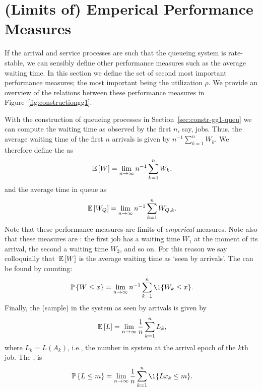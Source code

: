 \section{(Limits of) Emperical Performance Measures}
\label{sec:limits-of-emperical}

If the arrival and service processes are such that the queueing system
is rate-stable, we can sensibly define other performance measures such
as the average waiting time. In this section we define the set of
second most important performance measures; the most important being
the utilization $\rho$. We provide an overview of the relations
between these performance measures in
Figure~\ref{fig:constructiongg1}.


With the construction of queueing processes in
Section~\ref{sec:constr-gg1-queu} we can compute the waiting time as
observed by the first $n$, say, jobs. Thus, the average waiting time
of the first $n$ arrivals is given by $n^{-1}\sum_{k=1}^n W_k$. We
therefore define the  as
\begin{equation}\label{eq:49}
  \,\mathbb{E}\left[W\right] = \lim_{n\to\infty} n^{-1}\sum_{k=1}^n W_k,
\end{equation}
and the average time in queue as
\begin{equation}\label{eq:50}
  \,\mathbb{E}\left[W_Q\right] = \lim_{n\to\infty} n^{-1}\sum_{k=1}^n W_{Q,k}.
\end{equation}
Note that these performance measures are limits of \emph{emperical}
measures.  Note also that these measures are : the first job has a waiting time $W_1$
at the moment of its arrival, the second a waiting time $W_2$, and so
on. For this reason we say colloquially that $\,\mathbb{E}\left[W\right]$ is the average
waiting time as `seen by arrivals'.  The  can  be found by counting:
\begin{equation}\label{eq:48}
  \P{W \leq x}  = \lim_{n\to\infty} n^{-1}\sum_{k=1}^n \1{W_k\leq x}.
\end{equation}
Finally, the (sample)  in the system as seen by
arrivals is given by
\begin{equation}\label{eq:EQ}
\,\mathbb{E}\left[L\right] =  \lim_{n\to\infty}\frac 1 n \sum_{k=1}^n L_k,
\end{equation}
where $L_k = L(A_k)$, i.e., the number in system at the arrival epoch
of the $k$th job.  The , is
\begin{equation}\label{eq:Qm}
\P{L\leq m} = \lim_{n\to\infty} \frac 1 n \sum_{k=1}^n \1{Lx_k \leq m}.
\end{equation}



